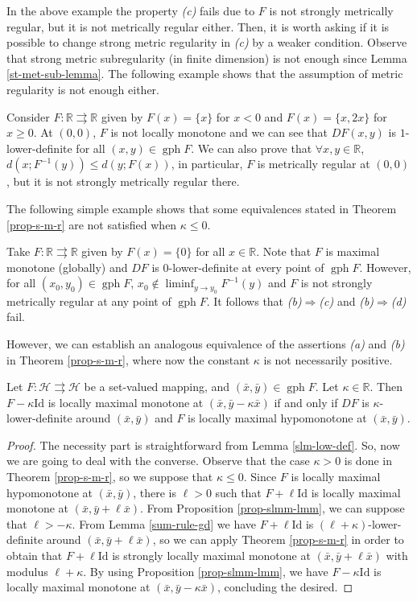 \documentclass[smallextended,envcountsect,envcountsame]{svjour3}
\renewcommand{\H}{\mathcal{H}}
\newcommand{\R}{\mathbb{R}}
\newcommand{\tto}{\rightrightarrows}
\newcommand{\gph}{\operatorname{gph}}
\newcommand{\1}{\mathds{1}}
\begin{document}
	In the above example the property \emph{(c)} fails due to $F$ is not strongly metrically regular, but it is not metrically regular either. Then, it is worth asking if it is possible to change strong metric regularity in \emph{(c)} by a weaker condition. Observe that strong metric subregularity (in finite dimension) is not enough since Lemma \ref{st-met-sub-lemma}. The following example shows that the assumption of metric regularity is not enough either.
	\begin{example}
		Consider $F\colon \R\tto \R$ given by $F(x) = \{x\}$ for $x<0$ and $F(x) = \{x,2x\}$ for $x\geq 0$. At $(0,0)$, $F$ is not locally monotone and we can see that $DF(x,y)$ is $1$-lower-definite for all $(x,y)\in \gph F$. We can also prove that $\forall x,y\in \R$, $d(x;F^{-1}(y))\leq d(y;F(x))$, in particular, $F$ is metrically regular at $(0,0)$, but it is not strongly metrically regular there. 
	\end{example}
	The following simple example shows that some equivalences stated in Theorem \ref{prop-s-m-r} are not satisfied when $\kappa \leq 0$.
	\begin{example}
		Take $F\colon \R\tto \R$ given by $F(x) = \{0\}$ for all $x\in \R$. Note that $F$ is maximal monotone (globally) and $DF$ is  $0$-lower-definite at every point of $\gph F$. However, for all $(x_0,y_0)\in \gph F$, $x_0\notin \liminf_{y\to y_0}F^{-1}(y)$ and $F$ is not strongly metrically regular at any point of $\gph F$. It follows that \emph{(b)}$\Rightarrow$\emph{(c)} and \emph{(b)}$\Rightarrow$\emph{(d)} fail.
	\end{example}
	However, we can establish an analogous equivalence of the assertions \emph{(a)} and \emph{(b)} in Theorem \ref{prop-s-m-r}, where now the constant $\kappa$ is not necessarily positive.
	\begin{corollary}\label{mon-0low-def}
		Let $F\colon \H\tto\H$ be a set-valued mapping, and $(\bar x,\bar y)\in \gph F$. Let $\kappa\in \R$. Then $F-\kappa\text{Id}$ is locally maximal monotone at $(\bar x,\bar y-\kappa\bar x)$ if and only if $DF$ is $\kappa$-lower-definite around $(\bar x,\bar y)$ and $F$ is locally maximal hypomonotone at $(\bar x,\bar y)$.
	\end{corollary}
	\begin{proof}
		The necessity part is straightforward from Lemma \ref{slm-low-def}. So, now we are going to deal with the converse. Observe that the case $\kappa>0$ is done in Theorem \ref{prop-s-m-r}, so we suppose that $\kappa\leq 0$. Since $F$ is locally maximal hypomonotone at $(\bar x,\bar y)$, there is $\ell>0$ such that $F+\ell\text{Id}$ is locally maximal monotone at $(\bar x,\bar y+\ell\bar x)$. From Proposition \ref{prop-slmm-lmm}, we can suppose that $\ell>-\kappa$. From Lemma \ref{sum-rule-gd} we have $F+\ell\text{Id}$ is $(\ell + \kappa)$-lower-definite around $(\bar x,\bar y+\ell\bar x)$, so we can apply Theorem \ref{prop-s-m-r} in order to obtain that $F+\ell \text{Id}$ is strongly locally maximal monotone at $(\bar x,\bar y+\ell \bar x)$ with modulus $\ell+\kappa$. By using Proposition \ref{prop-slmm-lmm}, we have $F-\kappa\text{Id}$ is locally maximal monotone at $(\bar x,\bar y-\kappa\bar x)$, concluding the desired.
	\end{proof}
	
\end{document}

